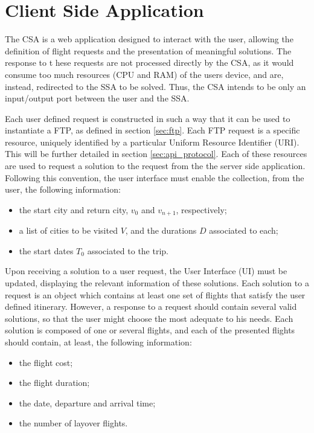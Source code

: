 \section{Client Side Application}
\label{sec:csa_design}

The CSA is a web application designed to interact with the user, allowing the definition of flight requests and the presentation of meaningful solutions. The response to t   hese requests are not processed directly by the CSA, as it would consume too much resources (CPU and RAM) of the users device, and are, instead, redirected to the SSA to be solved. Thus, the CSA intends to be only an input/output port between the user and the SSA. 

Each user defined request is constructed in such a way that it can be used to instantiate a FTP, as defined in section \ref{sec:ftp}. Each FTP request is a specific resource, uniquely identified by a particular Uniform Resource Identifier (URI). This will be further detailed in section \ref{sec:api_protocol}. Each of these resources are used to request a solution to the request from the the server side application. Following this convention, the user interface must enable the collection, from the user, the following information:

\begin{itemize}
  \item the start city and return city, $v_{0}$ and $v_{n+1}$, respectively;
  \item a list of cities to be visited $V$, and the durations $D$ associated to each;
  \item the start dates $T_{0}$ associated to the trip.
\end{itemize}

Upon receiving a solution to a user request, the User Interface (UI) must be updated, displaying the relevant information of these solutions. Each solution to a request is an object which contains at least one set of flights that satisfy the user defined itinerary. However, a response to a request should 
contain several valid solutions, so that the user might choose the most adequate to his needs.
Each solution is composed of one or several flights, and each of the presented flights should contain, at least, the following information:

\begin{itemize}
  \item the flight cost;
  \item the flight duration;
  \item the date, departure and arrival time;
  \item the number of layover flights.
\end{itemize}

